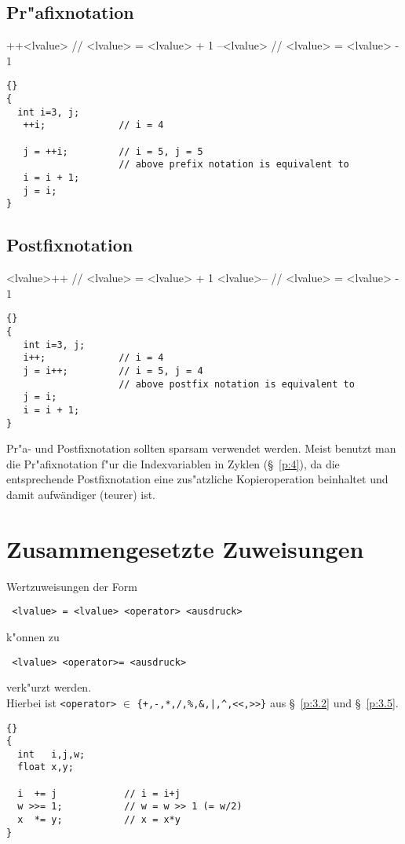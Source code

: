 \subsection{Pr"afixnotation}
\label{p:3.7.1}
%
\begin{minipage}[t] {0.95\textwidth}
\begin{boxedverbatim}
++<lvalue>               // <lvalue> = <lvalue> + 1
--<lvalue>               // <lvalue> = <lvalue> - 1
\end{boxedverbatim}
\end{minipage}
%
\begin{lstlisting}[caption=Präfixnotation,label=lst:3_7_1,basicstyle=\scriptsize]{}
{
  int i=3, j;
   ++i;             // i = 4

   j = ++i;         // i = 5, j = 5
                    // above prefix notation is equivalent to
   i = i + 1;
   j = i;
}
\end{lstlisting}
%
\subsection{Postfixnotation}
\label{p:3.7.2}
%
\begin{minipage}[t] {0.95\textwidth}
\begin{boxedverbatim}
<lvalue>++               // <lvalue> = <lvalue> + 1
<lvalue>--               // <lvalue> = <lvalue> - 1
\end{boxedverbatim}
\end{minipage}
%
\begin{lstlisting}[caption=Postfixnotation,label=lst:3_7_2,basicstyle=\scriptsize]{}
{
   int i=3, j;
   i++;             // i = 4
   j = i++;         // i = 5, j = 4
                    // above postfix notation is equivalent to
   j = i;
   i = i + 1;
}
\end{lstlisting}
%
Pr"a- und Postfixnotation sollten sparsam verwendet werden.
Meist benutzt man die Pr"afixnotation f"ur die Indexvariablen in Zyklen (\S~\ref{p:4}),
da die entsprechende Postfixnotation eine zus"atzliche Kopieroperation
beinhaltet und damit aufwändiger (teurer) ist.

%
%
%
\section{Zusammengesetzte Zuweisungen}
\label{p:3.8}
%
Wertzuweisungen der Form \\
\centerline{\texttt{
<lvalue> = <lvalue> <operator> <ausdruck>
}}
k"onnen zu \\
\centerline{\texttt{
<lvalue> <operator>= <ausdruck>
}}
verk"urzt werden. \\
Hierbei ist
{\texttt{<operator>} $\in$ \verb!{+,-,*,/,%,&,|,^,<<,>>}!} aus
\S~\ref{p:3.2} und \S~\ref{p:3.5}\enspace.{}
%
\begin{lstlisting}[caption=Kombination von Operatoren mit einer Zuweisung,label=lst:3_8,basicstyle=\scriptsize]{}
{
  int   i,j,w;
  float x,y;

  i  += j            // i = i+j
  w >>= 1;           // w = w >> 1 (= w/2)
  x  *= y;           // x = x*y
}
\end{lstlisting}
%
%
%
